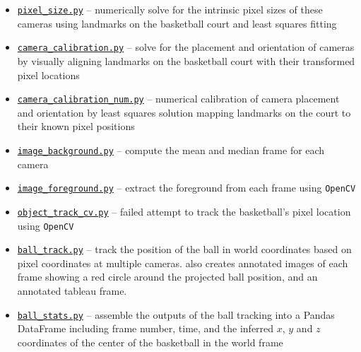 \documentclass{article}
\begin{document}
\begin{itemize}
\item \href{https://github.com/Harvard-AM-205-Basketball/Basketball/blob/master/src/pixel_size.py}
{\texttt{pixel\_size.py}} -- numerically solve for the intrinsic pixel sizes of these cameras using landmarks
on the basketball court and least squares fitting

\item \href{https://github.com/Harvard-AM-205-Basketball/Basketball/blob/master/src/camera_calibration.py}
{\texttt{camera\_calibration.py}} -- solve for the placement and orientation of cameras by visually aligning landmarks
on the basketball court with their transformed pixel locations

\item \href{https://github.com/Harvard-AM-205-Basketball/Basketball/blob/master/src/camera_calibration_num.py}
{\texttt{camera\_calibration\_num.py}} -- numerical calibration of camera placement and orientation by least
squares solution mapping landmarks on the court to their known pixel positions

\item \href{https://github.com/Harvard-AM-205-Basketball/Basketball/blob/master/src/image_background.py}
{\texttt{image\_background.py}} -- compute the mean and median frame for each camera

\item \href{https://github.com/Harvard-AM-205-Basketball/Basketball/blob/master/src/image_foreground.py}
{\texttt{image\_foreground.py}} -- extract the foreground from each frame using \texttt{OpenCV}

\item \href{https://github.com/Harvard-AM-205-Basketball/Basketball/blob/master/src/object_track_cv.py}
{\texttt{object\_track\_cv.py}} -- failed attempt to track the basketball's pixel location using \texttt{OpenCV}

\item \href{https://github.com/Harvard-AM-205-Basketball/Basketball/blob/master/src/ball_track.py}
{\texttt{ball\_track.py}} -- track the position of the ball in world coordinates based on pixel coordinates at multiple cameras.
also creates annotated images of each frame showing a red circle around the projected ball position, and an annotated tableau frame.

\item \href{https://github.com/Harvard-AM-205-Basketball/Basketball/blob/master/src/ball_stats.py}
{\texttt{ball\_stats.py}} -- assemble the outputs of the ball tracking into a Pandas DataFrame including frame number,
time, and the inferred $x$, $y$ and $z$ coordinates of the center of the basketball in the world frame

\end{itemize}
\end{document}

